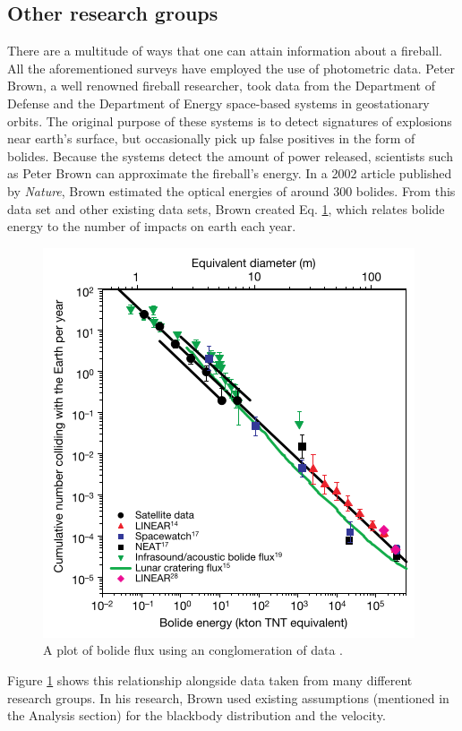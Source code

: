 \subsection{Other research groups}

There are a multitude of ways that one can attain information about a fireball.  
All the aforementioned surveys have employed the use of photometric data.
Peter Brown, a well renowned fireball researcher, took data from the Department of Defense and the Department of Energy space-based systems in geostationary orbits.
The original purpose of these systems is to detect signatures of explosions near earth's surface, but occasionally pick up false positives in the form of bolides.  
Because the systems detect the amount of power released, scientists such as Peter Brown can approximate the fireball's energy.
In a 2002 article published by \textit{Nature}, Brown estimated the optical energies of around 300 bolides.
From this data set and other existing data sets, Brown created Eq. \ref{powerlaw}, which relates bolide energy to the number of impacts on earth each year. 

\begin{figure}[ht!]
  \centering
  \includegraphics[scale=0.7]{images/flux_brown.png}
  \caption{A plot of bolide flux using an conglomeration of data \cite{brown_p_flux_2002}.}
  \label{powerlaw}
\end{figure}


Figure \ref{powerlaw} shows this relationship alongside data taken from many different research groups.  
In his research, Brown used existing assumptions (mentioned in the Analysis section) for the blackbody distribution and the velocity.  



